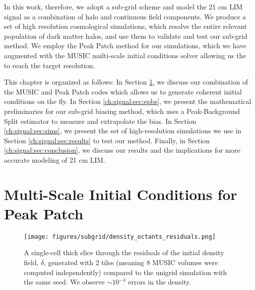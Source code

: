 In this work, therefore, we adopt a sub-grid scheme and model the 21 cm LIM signal as a combination of halo and continuous field components. We produce a set of high resolution cosmological simulations, which resolve the entire relevant population of dark matter halos, and use them to validate and test our sub-grid method. We employ the Peak Patch \citep{peakpatch1} method for our simulations, which we have augmented with the MUSIC multi-scale initial conditions solver allowing us the to reach the target resolution. 

This chapter is organized as follows: In Section \ref{ch:signal:sec:music}, we discuss our combination of the MUSIC and Peak Patch codes which allows us to generate coherent initial conditions on the fly. In Section \ref{ch:signal:sec:epbs}, we present the mathematical preliminaries for our sub-grid biasing method, which uses a Peak-Background Split \citep{biasreview} estimator to measure and extrapolate the bias. In Section \ref{ch:signal:sec:sims}, we present the set of high-resolution simulations we use in Section \ref{ch:signal:sec:results} to test our method. Finally, in Section \ref{ch:signal:sec:conclusion}, we discuss our results and the implications for more accurate modeling of 21 cm LIM.

\section{Multi-Scale Initial Conditions for Peak Patch}
\label{ch:signal:sec:music}

\begin{figure} %
\begin{center}
\texttt{[image: figures/subgrid/density\_octants\_residuals.png]}%
\caption{A single-cell thick slice through the residuals of the initial density field, $\delta$, generated with 2 tiles (meaning 8 MUSIC volumes were computed independently) compared to the unigrid simulation with the same seed. We observe $\sim 10^{-4}$ errors in the density.}
\label{density_octants_residuals}
\end{center}
\end{figure}

